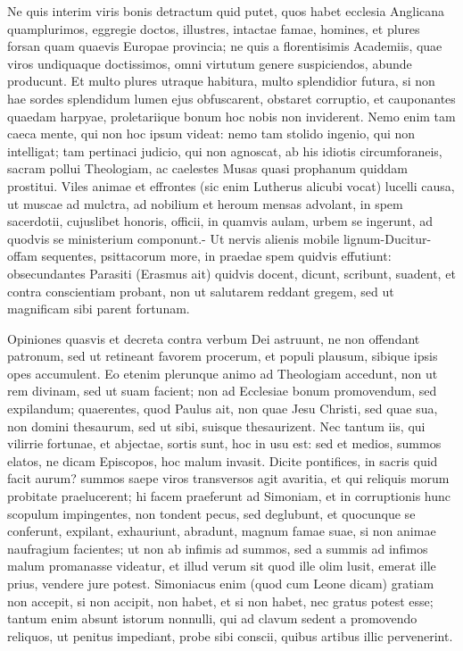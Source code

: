 {{Ne quis interim viris bonis detractum quid putet, quos habet ecclesia Anglicana quamplurimos,
eggregie doctos, illustres, intactae famae, homines, et plures forsan
quam quaevis Europae provincia; ne quis a florentisimis Academiis, quae
viros undiquaque doctissimos, omni virtutum genere suspiciendos, abunde
producunt. Et multo plures utraque habitura, multo splendidior futura,
si non hae sordes splendidum lumen ejus obfuscarent, obstaret
corruptio, et cauponantes quaedam harpyae, proletariique bonum hoc
nobis non inviderent. Nemo enim tam caeca mente, qui non hoc ipsum
videat: nemo tam stolido ingenio, qui non intelligat; tam pertinaci
judicio, qui non agnoscat, ab his idiotis circumforaneis, sacram pollui
Theologiam, ac caelestes Musas quasi prophanum quiddam prostitui. Viles
animae et effrontes (sic enim Lutherus  alicubi vocat) lucelli
causa, ut muscae ad mulctra, ad nobilium et heroum mensas advolant, in
spem sacerdotii, cujuslibet honoris, officii, in quamvis aulam, urbem
se ingerunt, ad quodvis se ministerium componunt.- Ut nervis alienis
mobile lignum-Ducitur-  offam sequentes,
psittacorum more, in praedae spem quidvis effutiunt: obsecundantes
Parasiti (Erasmus ait) quidvis docent, dicunt, scribunt, suadent,
et contra conscientiam probant, non ut salutarem reddant gregem, sed ut
magnificam sibi parent fortunam.

Opiniones quasvis et decreta contra verbum Dei astruunt, ne non offendant patronum, sed ut retineant
favorem procerum, et populi plausum, sibique ipsis opes accumulent. Eo
etenim plerunque animo ad Theologiam accedunt, non ut rem divinam, sed
ut suam facient; non ad Ecclesiae bonum promovendum, sed expilandum;
quaerentes, quod Paulus ait, non quae Jesu Christi, sed quae sua, non
domini thesaurum, sed ut sibi, suisque thesaurizent. Nec tantum iis,
qui vilirrie fortunae, et abjectae, sortis sunt, hoc in usu est: sed et
medios, summos elatos, ne dicam Episcopos, hoc malum invasit. 
Dicite pontifices, in sacris quid facit aurum? summos saepe viros
transversos agit avaritia, et qui reliquis morum probitate
praelucerent; hi facem praeferunt ad Simoniam, et in corruptionis hunc
scopulum impingentes, non tondent pecus, sed deglubunt, et quocunque se
conferunt, expilant, exhauriunt, abradunt, magnum famae suae, si non
animae naufragium facientes; ut non ab infimis ad summos, sed a summis
ad infimos malum promanasse videatur, et illud verum sit quod ille olim
lusit, emerat ille prius, vendere jure potest. Simoniacus enim (quod
cum Leone dicam) gratiam non accepit, si non accipit, non habet, et si
non habet, nec gratus potest esse; tantum enim absunt istorum nonnulli,
qui ad clavum sedent a promovendo reliquos, ut penitus impediant, probe
sibi conscii, quibus artibus illic pervenerint.

}}
